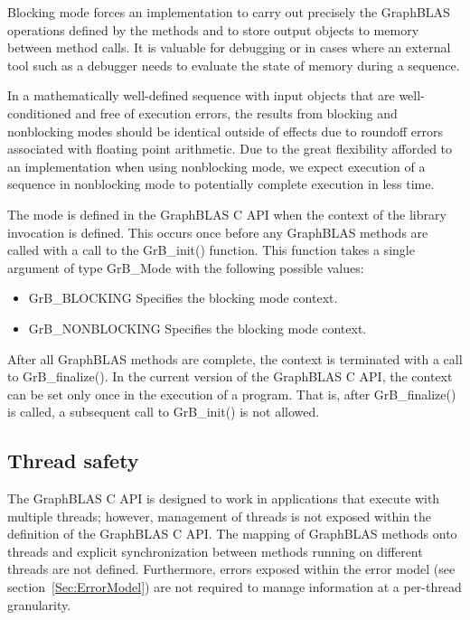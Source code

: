 Blocking mode forces an implementation to carry out precisely the
GraphBLAS operations defined by the methods and to store output objects
to memory between method calls.  It is valuable for debugging or in
cases where an external tool such as a debugger needs to evaluate the
state of memory during a sequence.

In a  mathematically well-defined sequence with input objects that
are well-conditioned and free of execution errors, the results from
blocking and nonblocking modes should be identical outside of effects
due to roundoff errors associated with floating point arithmetic.
Due to the great flexibility afforded to an implementation when using
nonblocking mode, we expect execution of a sequence in nonblocking mode
to potentially complete execution in less time.

The mode is defined in the GraphBLAS C API when the context of the
library invocation is defined.  This occurs once before any GraphBLAS
methods are called with a call to the {\sf GrB\_init()} function.  This function
takes a single argument of type {\sf GrB\_Mode} with the following possible values:
\begin{itemize}
\item {\sf GrB\_BLOCKING} Specifies the blocking mode context.
\item {\sf GrB\_NONBLOCKING} Specifies the blocking mode context.
\end{itemize}
After all GraphBLAS methods are complete, the context is terminated
with a call to {\sf GrB\_finalize()}.  In the current version of the
GraphBLAS C API, the context can be set only once in the execution of
a program. That is, after {\sf GrB\_finalize()} is called, a subsequent
call to {\sf GrB\_init()} is not allowed.


\subsection{Thread safety}
\label{Sec:ThreadSafety}

The GraphBLAS C API is designed to work in applications that execute with multiple threads; however, 
management of threads is not exposed within the definition of the GraphBLAS C API.   The mapping of 
GraphBLAS methods onto threads and explicit synchronization between methods running on different threads 
are not defined.  Furthermore, errors exposed within the error model (see section~\ref{Sec:ErrorModel}) are
not required to manage information at a per-thread granularity.

